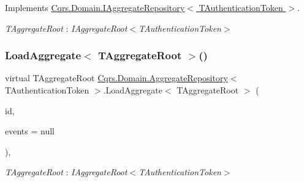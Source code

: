 Implements \hyperlink{interfaceCqrs_1_1Domain_1_1IAggregateRepository_a890633fddbd05bd3b9e9968a2de095bb}{Cqrs.\+Domain.\+I\+Aggregate\+Repository$<$ T\+Authentication\+Token $>$}.

\begin{Desc}
\item[Type Constraints]\begin{description}
\item[{\em T\+Aggregate\+Root} : {\em I\+Aggregate\+Root$<$T\+Authentication\+Token$>$}]\end{description}
\end{Desc}
\mbox{\label{classCqrs_1_1Domain_1_1AggregateRepository_a53bf020a5f2a0f697f361065b792cf61}} 
\subsubsection{\texorpdfstring{Load\+Aggregate$<$ T\+Aggregate\+Root $>$()}{LoadAggregate< TAggregateRoot >()}}
{\footnotesize\ttfamily virtual T\+Aggregate\+Root \hyperlink{classCqrs_1_1Domain_1_1AggregateRepository}{Cqrs.\+Domain.\+Aggregate\+Repository}$<$ T\+Authentication\+Token $>$.Load\+Aggregate$<$ T\+Aggregate\+Root $>$ (\begin{DoxyParamCaption}\item[{Guid}]{id,  }\item[{I\+List$<$ \hyperlink{interfaceCqrs_1_1Events_1_1IEvent}{I\+Event}$<$ T\+Authentication\+Token $>$$>$}]{events = {\ttfamily null} }\end{DoxyParamCaption})\hspace{0.3cm}{\ttfamily [protected]}, {\ttfamily [virtual]}}

\begin{Desc}
\item[Type Constraints]\begin{description}
\item[{\em T\+Aggregate\+Root} : {\em I\+Aggregate\+Root$<$T\+Authentication\+Token$>$}]\end{description}
\end{Desc}
\mbox{\label{classCqrs_1_1Domain_1_1AggregateRepository_af26efcb464ac989962a9ad138466e4d7}} 
